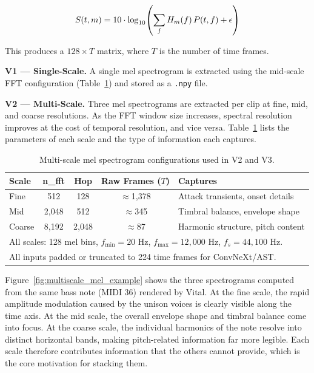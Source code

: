 \begin{equation}
S(t, m) = 10 \cdot \log_{10}\!\left(\sum_{f} H_m(f)\, P(t, f) + \epsilon\right)
\label{eq:mel}\eqname{Log-mel spectrogram}
\end{equation}

\noindent This produces a $128 \times T$ matrix, where $T$ is the number of time frames.

\par \vspace{0.3cm}
\noindent \textbf{V1 --- Single-Scale.} A single mel spectrogram is extracted using the mid-scale FFT configuration (Table~\ref{tab:mel_scales}) and stored as a \texttt{.npy} file.

\par \vspace{0.3cm}
\noindent \textbf{V2 --- Multi-Scale.} Three mel spectrograms are extracted per clip at fine, mid, and coarse resolutions. As the FFT window size increases, spectral resolution improves at the cost of temporal resolution, and vice versa. Table~\ref{tab:mel_scales} lists the parameters of each scale and the type of information each captures.

\begin{table}[H]
\centering
\renewcommand{\arraystretch}{1.3}
\begin{tabular}{lcccp{4.5cm}}
\hline
\textbf{Scale} & \textbf{n\_fft} & \textbf{Hop} & \textbf{Raw Frames ($T$)} & \textbf{Captures} \\
\hline
Fine   & 512     & 128     & $\approx$1{,}378 & Attack transients, onset details \\
Mid    & 2{,}048 & 512     & $\approx$345     & Timbral balance, envelope shape  \\
Coarse & 8{,}192 & 2{,}048 & $\approx$87      & Harmonic structure, pitch content \\
\hline
\multicolumn{5}{l}{\small All scales: 128 mel bins, $f_{\min}=20$ Hz, $f_{\max}=12{,}000$ Hz, $f_s=44{,}100$ Hz.}\\
\multicolumn{5}{l}{\small All inputs padded or truncated to 224 time frames for ConvNeXt/AST.}\\
\hline
\end{tabular}
\vspace{0.3cm}
\caption{Multi-scale mel spectrogram configurations used in V2 and V3.}
\label{tab:mel_scales}
\end{table}

Figure~\ref{fig:multiscale_mel_example} shows the three spectrograms computed from the same bass note (MIDI 36) rendered by Vital. At the fine scale, the rapid amplitude modulation caused by the unison voices is clearly visible along the time axis. At the mid scale, the overall envelope shape and timbral balance come into focus. At the coarse scale, the individual harmonics of the note resolve into distinct horizontal bands, making pitch-related information far more legible. Each scale therefore contributes information that the others cannot provide, which is the core motivation for stacking them.

